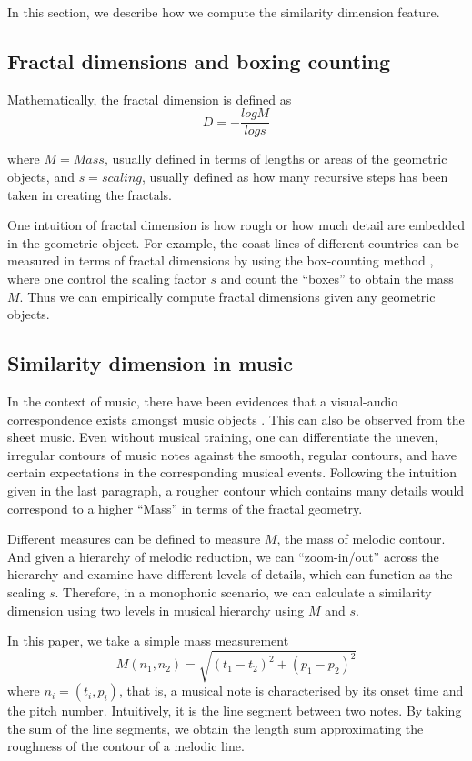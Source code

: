 \documentclass[acmsmall,10pt]{acmart}%
\begin{document}
In this section, we describe how we compute the similarity dimension feature.

\subsection{Fractal dimensions and boxing counting}
Mathematically, the fractal dimension is defined as $$D=-\frac{logM}{logs}$$

where $M=Mass$, usually defined in terms of lengths or areas of the geometric
objects, and $s=scaling$, usually defined as how many recursive steps has been
taken in creating the fractals.

One intuition of fractal dimension is how rough or how much detail are embedded
in the geometric object. For example, the coast lines of different countries can
be measured in terms of fractal dimensions by using the box-counting method
\cite{sarkar1994efficient}, where one control the scaling factor $s$ and count
the ``boxes'' to obtain the mass $M$. Thus we can empirically compute fractal dimensions
given any geometric objects. 

\subsection{Similarity dimension in music}
In the context of music, there have been evidences that a visual-audio
correspondence exists amongst music objects \cite{thorpe2016perception}. This
can also be observed from the sheet music. Even without musical training, one can differentiate the
uneven, irregular contours of music notes against the smooth, regular contours,
and have certain expectations in the corresponding musical events. Following the
intuition given in the last paragraph, a rougher
contour which contains many details would correspond to a higher ``Mass'' in
terms of the fractal geometry.

Different measures can be defined to measure $M$, the mass of melodic contour. And
given a hierarchy of melodic reduction, we can ``zoom-in/out'' across the
hierarchy and examine have different levels of details, which can function as the scaling $s$.
Therefore, in a monophonic scenario, we can calculate a similarity dimension
using two levels in musical hierarchy using $M$ and $s$. 

In this paper, we take a simple mass measurement
$$M(n_1, n_2) = \sqrt{(t_1-t_2)^2 +(p_1-p_2)^2}$$
  where $n_i=(t_i, p_i)$, that is, a musical note is characterised by its onset time and
the pitch number. 
Intuitively, it is the line segment between two notes. By taking the sum of the
line segments, we obtain the length sum approximating the roughness of the contour
of a melodic line. 
\end{document}
